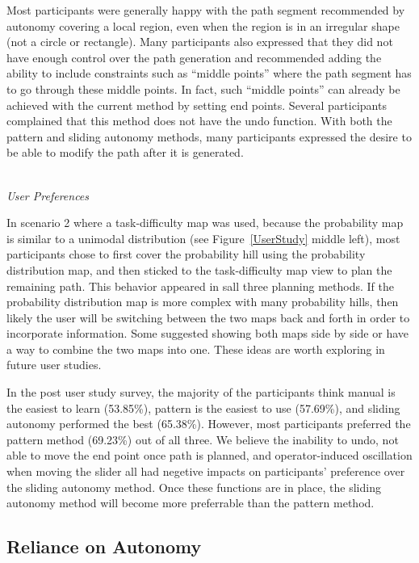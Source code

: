 Most participants were generally happy with the path segment recommended by autonomy covering a local region, even when the region is in an irregular shape (not a circle or rectangle). Many participants also expressed that they did not have enough control over the path generation and recommended adding the ability to include constraints such as ``middle points'' where the path segment has to go through these middle points. In fact, such ``middle points'' can already be achieved with the current method by setting end points. Several participants complained that this method does not have the undo function. With both the pattern and sliding autonomy methods, many participants expressed the desire to be able to modify the path after it is generated.

~\\ \noindent \textit{User Preferences}

In scenario 2 where a task-difficulty map was used, because the probability map is similar to a unimodal distribution (see Figure~\ref{UserStudy} middle left), most participants chose to first cover the probability hill using the probability distribution map, and then sticked to the task-difficulty map view to plan the remaining path. This behavior appeared in sall three planning methods. If the probability distribution map is more complex with many probability hills, then likely the user will be switching between the two maps back and forth in order to incorporate information. Some suggested showing both maps side by side or have a way to combine the two maps into one. These ideas are worth exploring in future user studies.

In the post user study survey, the majority of the participants think manual is the easiest to learn (53.85\%), pattern is the easiest to use (57.69\%), and sliding autonomy performed the best (65.38\%). However, most participants preferred the pattern method (69.23\%) out of all three. We believe the inability to undo, not able to move the end point once path is planned, and operator-induced oscillation when moving the slider all had negetive impacts on participants' preference over the sliding autonomy method. Once these functions are in place, the sliding autonomy method will become more preferrable than the pattern method.

\subsection{Reliance on Autonomy}

